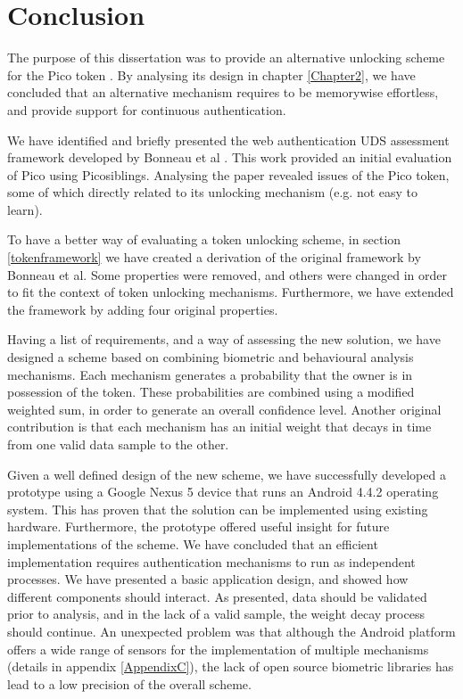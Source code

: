 
\chapter{Conclusion} %

\label{Chapter7} %


The purpose of this dissertation was to provide an alternative unlocking scheme for the Pico token \cite{stajano2011pico}. By analysing its design in chapter \ref{Chapter2}, we have concluded that an alternative mechanism requires to be memorywise effortless, and provide support for continuous authentication.

We have identified and briefly presented the web authentication UDS assessment framework developed by Bonneau et al \cite{bonneau2012quest}. This work provided an initial evaluation of Pico using Picosiblings. Analysing the paper revealed issues of the Pico token, some of which directly related to its unlocking mechanism (e.g. not easy to learn).

To have a better way of evaluating a token unlocking scheme, in section \ref{tokenframework} we have created a derivation of the original framework by Bonneau et al. Some properties were removed, and others were changed in order to fit the context of token unlocking mechanisms. Furthermore, we have extended the framework by adding four original properties.

Having a list of requirements, and a way of assessing the new solution, we have designed a scheme based on combining biometric and behavioural analysis mechanisms. Each mechanism generates a probability that the owner is in possession of the token. These probabilities are combined using a modified weighted sum, in order to generate an overall confidence level. Another original contribution is that each mechanism has an initial weight that decays in time from one valid data sample to the other. 

Given a well defined design of the new scheme, we have successfully developed a prototype using a Google Nexus 5 device that runs an Android 4.4.2 operating system. This has proven that the solution can be implemented using existing hardware. Furthermore, the prototype offered useful insight for future implementations of the scheme. We have concluded that an efficient implementation requires authentication mechanisms to run as independent processes. We have presented a basic application design, and showed how different components should interact. As presented, data should be validated prior to analysis, and in the lack of a valid sample, the weight decay process should continue. An unexpected problem was that although the Android platform offers a wide range of sensors for the implementation of multiple mechanisms (details in appendix \ref{AppendixC}), the lack of open source biometric libraries has lead to a low precision of the overall scheme.


